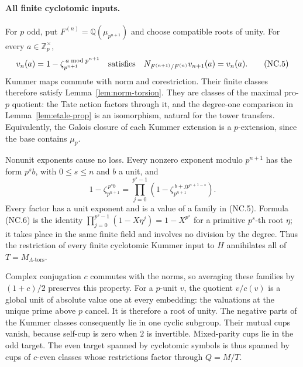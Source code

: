 \documentclass[11pt,a4paper]{article}
\theoremstyle{definition}
\begin{document}
\paragraph{All finite cyclotomic inputs.}
For \(p\) odd, put \(F^{(n)}=\mathbb Q(\mu_{p^{n+1}})\) and choose
compatible roots of unity.  For every \(a\in\mathbb Z_p^\times\),
\[
 v_n(a)=1-\zeta_{p^{n+1}}^{\,a\bmod p^{n+1}}
 \quad\hbox{satisfies}\quad
 N_{F^{(n+1)}/F^{(n)}}v_{n+1}(a)=v_n(a).                    \tag{NC.5}
\]
Kummer maps commute with norm and corestriction.  Their finite
classes therefore satisfy Lemma~\ref{lem:norm-torsion}.
They are classes of the maximal pro-\(p\) quotient: the Tate
action factors through it, and the degree-one comparison in
Lemma~\ref{lem:etale-prop} is an isomorphism, natural for the
tower transfers.  Equivalently, the Galois closure of each Kummer
extension is a \(p\)-extension, since the base contains \(\mu_p\).

Nonunit exponents cause no loss.  Every nonzero exponent modulo
\(p^{n+1}\) has the form \(p^s b\), with \(0\leq s\leq n\) and
\(b\) a unit, and
\[
 1-\zeta_{p^{n+1}}^{\,p^s b}
  =\prod_{j=0}^{p^s-1}
       \left(1-\zeta_{p^{n+1}}^{\,b+jp^{n+1-s}}\right).
                                                               \tag{NC.6}
\]
Every factor has a unit exponent and is a value of a family in
(NC.5).  Formula (NC.6) is the identity
\(\prod_{j=0}^{p^s-1}(1-X\eta^j)=1-X^{p^s}\) for a primitive
\(p^s\)-th root \(\eta\); it takes place in the same finite field
and involves no division by the degree.  Thus the restriction of
every finite cyclotomic Kummer input to \(H\) annihilates all of
\(T=M_{\Lambda\text{-tors}}\).

Complex conjugation \(c\) commutes with the norms, so averaging
these families by \((1+c)/2\) preserves this property.
For a \(p\)-unit \(v\), the quotient \(v/c(v)\) is a global unit
of absolute value one at every embedding: the valuations at the
unique prime above \(p\) cancel.  It is therefore a root of unity.
The negative parts of the Kummer classes consequently lie in one
cyclic subgroup.  Their mutual cups vanish, because self-cup is
zero when \(2\) is invertible.  Mixed-parity cups lie in the odd
target.  The even target spanned by cyclotomic symbols is thus
spanned by cups of \(c\)-even classes whose restrictions factor
through \(Q=M/T\).
\end{document}
